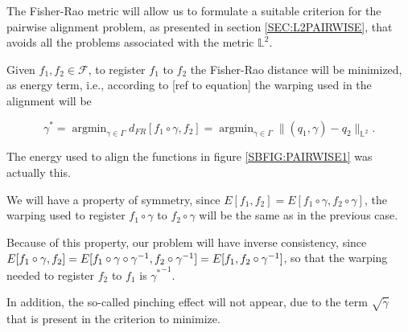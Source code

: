 
The Fisher-Rao metric will allow us to formulate a suitable criterion for the
pairwise alignment problem, as presented in section \ref{SEC:L2PAIRWISE},
 that avoids all the problems associated with the metric $\mathbb{L}^2$.

Given $f_1, f_2 \in \mathscr{F}$, to register $f_1$ to $f_2$ the Fisher-Rao distance
will be minimized, as energy term, i.e., according to [ref to equation]
the warping used in the alignment will be

$$
\gamma^{*}= \operatorname{argmin}_{\gamma \in \Gamma} d_{FR}[f_1 \circ \gamma,
f_2] = \operatorname{argmin}_{\gamma \in \Gamma} \|
(q_1, \gamma) - q_2 \|_{\mathbb{L}^2}.
$$

The energy used to align the functions in figure \ref{SBFIG:PAIRWISE1} was
actually this.

We will have a property of symmetry, since
$E[f_1, f_2] = E[f_1 \circ \gamma, f_2 \circ \gamma]$, the warping used to
register $f_1 \circ \gamma$ to $f_2 \circ \gamma$ will be the same as in the
previous case.

Because of this property, our problem will have inverse consistency, since
$E[f_1 \circ \gamma, f_2] = \\ E[f_1 \circ \gamma \circ \gamma^{-1}, f_2
\circ \gamma^{-1}] = E[f_1, f_2 \circ \gamma^{-1}]$, so that the
warping needed to register $f_2$ to $f_1$  is ${\gamma^*}^{-1}$.


In addition, the so-called pinching effect will not appear, due to the term
$\sqrt{\dot \gamma}$ that is present in the criterion to minimize.
